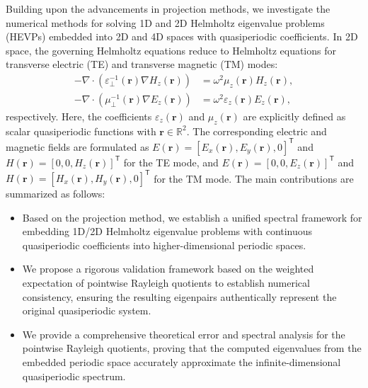 \documentclass[11pt]{article}
\numberwithin{equation}{section}
\begin{document}
Building upon the advancements in projection methods, we investigate the numerical methods for solving 1D and 2D Helmholtz eigenvalue problems (HEVPs) embedded into 2D and 4D spaces with quasiperiodic coefficients. In 2D space, the governing Helmholtz equations reduce to Helmholtz equations for transverse electric (TE) and transverse magnetic (TM) modes:
\begin{align}
    -\nabla\cdot(\varepsilon_\bot^{-1}(\mathbf{r})\nabla H_z(\mathbf{r}))&=\omega^2\mu_z(\mathbf{r})H_z(\mathbf{r}), \label{evp: TE mode} \\
    -\nabla\cdot(\mu_\bot^{-1}(\mathbf{r})\nabla E_z(\mathbf{r}))&=\omega^2\varepsilon_z(\mathbf{r})E_z(\mathbf{r}), \label{evp: TM mode}
\end{align}
respectively. Here, the coefficients $\varepsilon_z(\mathbf{r})$ and $\mu_z(\mathbf{r})$ are explicitly defined as scalar quasiperiodic functions with $\mathbf{r}\in\mathbb{R}^2$. The corresponding electric and magnetic fields are formulated as $E(\mathbf{r})=[E_x(\mathbf{r}),E_y(\mathbf{r}),0]^\mathsf{T}$ and $H(\mathbf{r})=[0,0,H_z(\mathbf{r})]^\mathsf{T}$ for the TE mode, and $E(\mathbf{r})=[0,0,E_z(\mathbf{r})]^\mathsf{T}$ and $H(\mathbf{r})=[H_x(\mathbf{r}),H_y(\mathbf{r}),0]^\mathsf{T}$ for the TM mode. The main contributions are summarized as follows:
\begin{itemize}
    \item Based on the projection method, we establish a unified spectral framework for embedding 1D/2D Helmholtz eigenvalue problems with continuous quasiperiodic coefficients into higher-dimensional periodic spaces.
    \item We propose a rigorous validation framework based on the weighted expectation of pointwise Rayleigh quotients to establish numerical consistency, ensuring the resulting eigenpairs authentically represent the original quasiperiodic system.
    \item We provide a comprehensive theoretical error and spectral analysis for the pointwise Rayleigh quotients, proving that the computed eigenvalues from the embedded periodic space accurately approximate the infinite-dimensional quasiperiodic spectrum.
\end{itemize}
\end{document}
